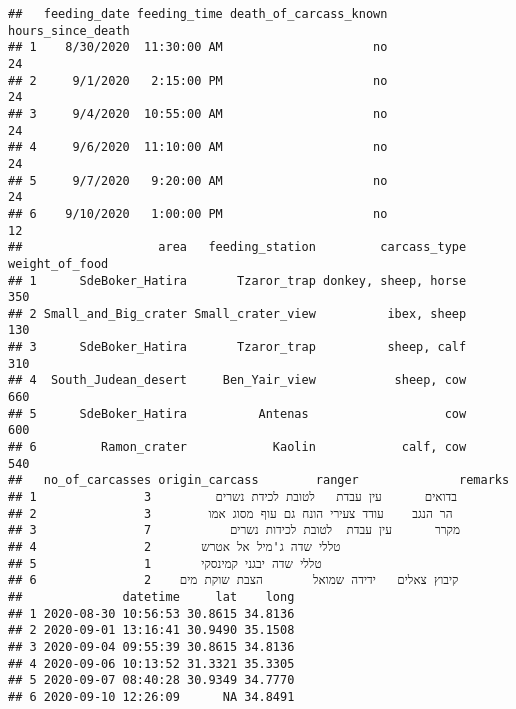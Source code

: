 \documentclass[
]{article}
\begin{document}
\begin{verbatim}
##   feeding_date feeding_time death_of_carcass_known hours_since_death
## 1    8/30/2020  11:30:00 AM                     no                24
## 2     9/1/2020   2:15:00 PM                     no                24
## 3     9/4/2020  10:55:00 AM                     no                24
## 4     9/6/2020  11:10:00 AM                     no                24
## 5     9/7/2020   9:20:00 AM                     no                24
## 6    9/10/2020   1:00:00 PM                     no                12
##                   area   feeding_station         carcass_type weight_of_food
## 1      SdeBoker_Hatira       Tzaror_trap donkey, sheep, horse            350
## 2 Small_and_Big_crater Small_crater_view          ibex, sheep            130
## 3      SdeBoker_Hatira       Tzaror_trap          sheep, calf            310
## 4  South_Judean_desert     Ben_Yair_view           sheep, cow            660
## 5      SdeBoker_Hatira          Antenas                   cow            600
## 6         Ramon_crater            Kaolin            calf, cow            540
##   no_of_carcasses origin_carcass        ranger              remarks
## 1               3         בדואים      עין עבדת   לטובת לכידת נשרים 
## 2               3        הר הנגב    עודד צעירי הונח גם עוף מסוג אמו
## 3               7           מקרר      עין עבדת  לטובת לכידות נשרים 
## 4               2       טללי שדה ג'מיל אל אטרש                     
## 5               1       טללי שדה יבגני קמינסקי                     
## 6               2    קיבוץ צאלים   ידידה שמואל       הצבת שוקת מים 
##              datetime     lat    long
## 1 2020-08-30 10:56:53 30.8615 34.8136
## 2 2020-09-01 13:16:41 30.9490 35.1508
## 3 2020-09-04 09:55:39 30.8615 34.8136
## 4 2020-09-06 10:13:52 31.3321 35.3305
## 5 2020-09-07 08:40:28 30.9349 34.7770
## 6 2020-09-10 12:26:09      NA 34.8491
\end{verbatim}
\end{document}
